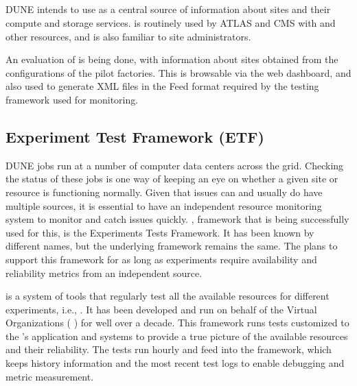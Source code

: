 \documentclass[../main-v1.tex]{subfiles}
\begin{document}
\subsection{} %

DUNE intends to use   as a central source of information about sites and their compute and storage services.  is routinely used by ATLAS and CMS with  and other  resources, and is also familiar to site administrators. 

An evaluation of  is being done, with information about sites obtained from the configurations of the  pilot factories. This is browsable via the  web dashboard, and also used to generate XML files in the  Feed format required by the  testing framework used for monitoring.

\subsection{Experiment Test Framework (ETF)}

DUNE jobs run at a number of computer data centers across the grid. Checking the status of these jobs is one way of keeping an eye on whether a given site or resource is functioning normally. Given that issues can and usually do have multiple sources, it is essential to have an independent resource monitoring system to monitor and %
catch issues quickly. %
, framework that is being successfully used for this, is the  %
 Experiments Tests Framework\cite{bib:ETFDoc, bib:ETFStatus}. It  has been known by different names, but the underlying framework remains the same. The  plans to support this framework for as long as  experiments require availability and reliability metrics from an independent source.
 
 is a system of tools that regularly test all the available resources for different experiments, i.e., . It has been developed and run on behalf of the  Virtual Organizations ( %
 ) for well over a decade. %
This framework runs tests customized to the 's application and systems to provide a true picture of the  available resources and their reliability. The  tests run hourly and feed into the  
framework, which keeps history information and the most recent test logs to enable debugging and metric measurement.
\end{document}
